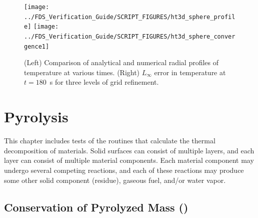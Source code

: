 \documentclass[11pt]{book}
\begin{document}
\begin{figure}[ht]
\centering
\texttt{[image: ../FDS\_Verification\_Guide/SCRIPT\_FIGURES/ht3d\_sphere\_profile]}
\texttt{[image: ../FDS\_Verification\_Guide/SCRIPT\_FIGURES/ht3d\_sphere\_convergence1]}
\caption[The  temperature profiles and convergence rate]{(Left) Comparison of analytical and numerical radial profiles of temperature at various times. (Right) $L_{\infty}$ error in temperature at $t=180$~s for three levels of grid refinement.}
\label{fig:ht3d_sphere_time}
\end{figure}




\chapter{Pyrolysis}

This chapter includes tests of the routines that calculate the thermal decomposition of materials. Solid surfaces can consist of multiple layers, and each layer can consist of multiple material components. Each material component may undergo several competing reactions, and each of these reactions may produce some other solid component (residue), gaseous fuel, and/or water vapor.

\section{Conservation of Pyrolyzed Mass (\texorpdfstring{}{surf\_mass\_conservation})}
\end{document}
